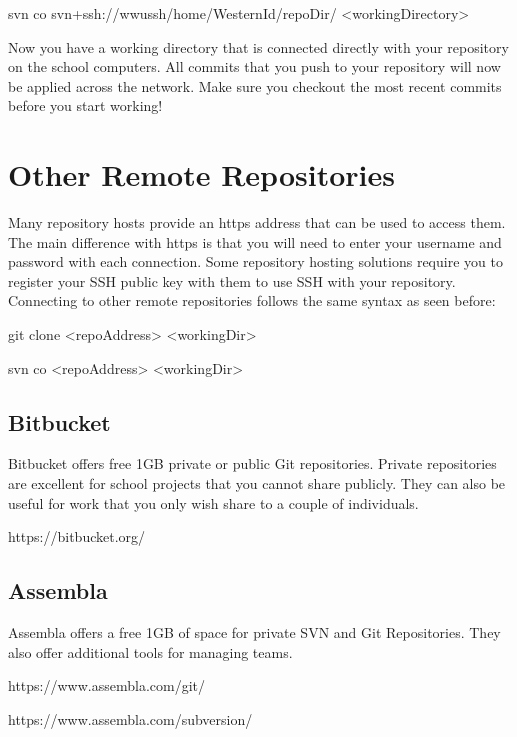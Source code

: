 \documentclass[oneside]{book}
\begin{document}
    \begin{svncode}
svn co svn+ssh://wwussh/home/WesternId/repoDir/ <workingDirectory>
    \end{svncode}
Now you have a working directory that is connected directly with your repository on the school computers. All commits that you push to your repository will now be applied across the network. Make sure you checkout the most recent commits before you start working! 
    
\section{Other Remote Repositories}
Many repository hosts provide an https address that can be used to access them. The main difference with https is that you will need to enter your username and password with each connection. Some repository hosting solutions require you to register your SSH public key with them to use SSH with your repository. Connecting to other remote repositories follows the same syntax as seen before: 
    \begin{gitcode}
    git clone <repoAddress> <workingDir>
    \end{gitcode}
    \begin{svncode}
    svn co <repoAddress> <workingDir>
    \end{svncode}

\subsection{Bitbucket}
Bitbucket offers free 1GB private or public Git repositories. Private repositories are excellent for school projects that you cannot share publicly. They can also be useful for work that you only wish share to a couple of individuals. 
    \begin{gitcode}
    https://bitbucket.org/
    \end{gitcode}

\subsection{Assembla}
Assembla offers a free 1GB of space for private SVN and Git Repositories. They also offer additional tools for managing teams. 
    \begin{gitcode}
    https://www.assembla.com/git/
    \end{gitcode}
    \begin{svncode}
    https://www.assembla.com/subversion/
    \end{svncode}
\end{document}
